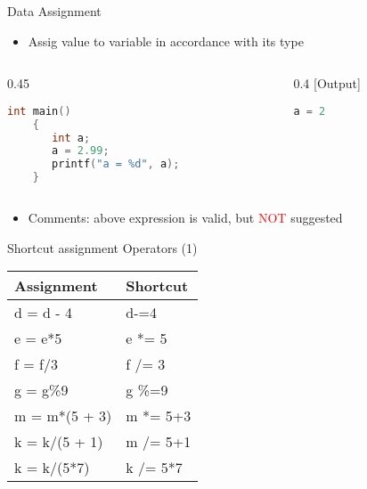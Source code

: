 \begin{frame}[fragile]{Data Assignment}
\begin{itemize}
	\item {Assig value to variable in accordance with its type}
\end{itemize}
\begin{columns}
\begin{column}{0.45\linewidth}
	\begin{lstlisting}[numbers=none, language=c, rulecolor=\color{blue}]
	int main()
	{ 
	   int a;
	   a = 2.99;
	   printf("a = %d", a);
	}
	\end{lstlisting}
\end{column}
\begin{column}{0.4\linewidth}
  [Output]
	\begin{lstlisting}[numbers=none, language=c, rulecolor=\color{blue}]
	a = 2
	\end{lstlisting}
\end{column}
\end{columns}
\begin{itemize}
	\item {Comments: above expression is valid, but \textcolor{red}{NOT} suggested}
\end{itemize}
\end{frame}

\begin{frame}[fragile]{Shortcut assignment Operators (1)}
\begin{table}
	\begin{center}
	\begin{tabular}{|l|l|} 
	\hline
	Assignment & Shortcut \\ \hline
	d = d - 4 & d-=4 \\ \hline
	e = e*5  & e *= 5 \\ \hline
	f = f/3 & f /= 3 \\ \hline
	g = g\%9 & g \%=9 \\ \hline \hline
	m = m*(5 + 3) & m *= 5+3 \\ \hline
	k = k/(5 + 1) & m /= 5+1 \\ \hline
	k = k/(5*7) & k /= 5*7 \\ \hline
	\end{tabular}
	\end{center}
\end{table}
\end{frame}

